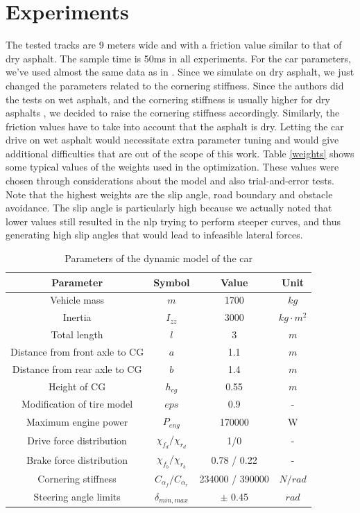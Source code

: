 \documentclass[a4paper, onecolumn, 12pt]{article}
\begin{document}
\section{Experiments}
The tested tracks are 9 meters wide and with a friction value similar to that of
dry asphalt. The sample time is 50ms in all experiments. For the car parameters,
we've used almost the same data as in \cite{paper}. Since we simulate on dry
asphalt, we just changed the parameters related to the cornering stiffness.
Since the authors did the tests on wet asphalt, and the cornering stiffness is
usually higher for dry asphalts \cite{stiffness}, we decided to raise the
cornering stiffness accordingly. Similarly, the friction values have to take
into account that the asphalt is dry. Letting the car drive on wet asphalt would
necessitate extra parameter tuning and would give additional difficulties that
are out of the scope of this work. Table \ref{weights} shows some typical values
of the weights used in the optimization. These values were chosen through
considerations about the model and also trial-and-error tests. Note that the
highest weights are the slip angle, road boundary and obstacle avoidance. The
slip angle is particularly high because we actually noted that lower values
still resulted in the nlp trying to perform steeper curves, and thus generating
high slip angles that would lead to infeasible lateral forces. 
\begin{table}[H]
    \centering
    \caption{Parameters of the dynamic model of the car} \label{params}
    \begin{tabular}{ |c|c|c|c| }
        \hline
        \textbf{Parameter} & \textbf{Symbol} & \textbf{Value} & \textbf{Unit} \\ [0.5ex] 
        \hline
        \hline 
        Vehicle mass & $m$ & 1700 & $kg$\\ 
        \hline
        Inertia & $I_{zz}$ & 3000 & $kg \cdot m^2$\\
        \hline
        Total length & $l$ & 3 & $m$\\
        \hline
        Distance from front axle to CG & $a$ & 1.1 & $m$\\
        \hline
        Distance from rear axle to CG & $b$ & 1.4 & $m$\\
        \hline
        Height of CG & $h_{cg}$ & 0.55 & $m$\\
        \hline
        Modification of tire model & $eps$ & 0.9 & -\\
        \hline
        Maximum engine power & $P_{eng}$ & 170000 & W \\
        \hline
        Drive force distribution & $\chi_{f_d} / \chi_{r_d}$ & 1/0 & -\\
        \hline
        Brake force distribution & $\chi_{f_b} / \chi_{r_b}$ & 0.78 / 0.22 & -\\
        \hline
        Cornering stiffness & $C_{\alpha_f} / C_{\alpha_r}$ & 234000 / 390000 & $N/rad$\\
        \hline
        Steering angle limits & $\delta_{min,max}$ & $\pm$ 0.45 & $rad$ \\
        \hline

    \end{tabular}
\end{table}
\end{document}
